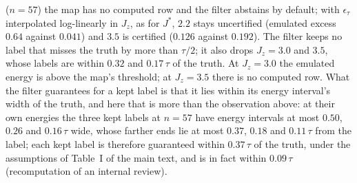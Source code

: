 \documentclass[aps,prx,onecolumn,10pt,nofootinbib,longbibliography,floatfix]{revtex4-2}
\theoremstyle{remark}
\newcommand{\Jz}{J_z}
\begin{document}
($n=57$) the map has no computed row and the filter abstains by default; with $\epsilon_\tau$ interpolated
log-linearly in $\Jz$, as for $J^*$, $2.2$ stays uncertified (emulated excess $0.64$ against $0.041$) and $3.5$ is %
certified ($0.126$ against $0.192$). The filter keeps no label that misses the truth by more than $\tau/2$; it %
also drops $\Jz=3.0$ and $3.5$, whose labels are within $0.32$ and $0.17\,\tau$ of the truth. %
At $\Jz=3.0$ the emulated energy is above the map's threshold; at $\Jz=3.5$ there is no computed row. %
What the filter guarantees for a kept label is that it lies within its energy interval's width of the truth, and
here that is more than the observation above: at their own energies the three kept labels at $n=57$ have energy %
intervals at most $0.50$, $0.26$ and $0.16\,\tau$ wide, whose farther ends lie at most $0.37$, $0.18$ and %
$0.11\,\tau$ from the label; each kept label is therefore guaranteed within $0.37\,\tau$ of the truth, under the %
assumptions of Table~I of the main text, and is in fact within $0.09\,\tau$ (recomputation of an internal review). %
\end{document}
